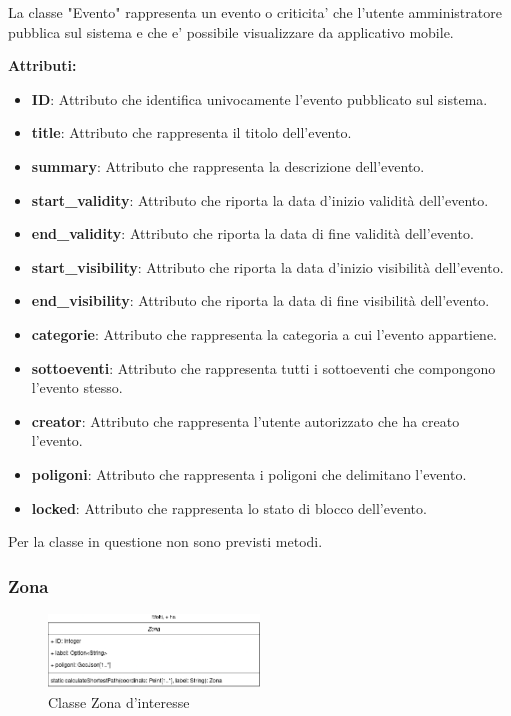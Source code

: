 \documentclass{article}
\begin{document}
La classe "Evento" rappresenta un evento o criticita' che l'utente amministratore pubblica sul sistema e che e' possibile visualizzare da applicativo mobile.

\textbf{Attributi:}\\
\begin{itemize}
	\item \textbf{ID}: Attributo che identifica univocamente l'evento pubblicato sul sistema.
	\item \textbf{title}: Attributo che rappresenta il titolo dell'evento.
	\item \textbf{summary}: Attributo che rappresenta la descrizione dell'evento.
	\item \textbf{start\_validity}: Attributo che riporta la data d'inizio validità dell'evento.
	\item \textbf{end\_validity}: Attributo che riporta la data di fine validità dell'evento.
	\item \textbf{start\_visibility}: Attributo che riporta la data d'inizio visibilità dell'evento.
	\item \textbf{end\_visibility}: Attributo che riporta la data di fine visibilità dell'evento.
	\item \textbf{categorie}: Attributo che rappresenta la categoria a cui l'evento appartiene.
	\item \textbf{sottoeventi}: Attributo che rappresenta tutti i sottoeventi che compongono l'evento stesso.
	\item \textbf{creator}: Attributo che rappresenta l'utente autorizzato che ha creato l'evento.
	\item \textbf{poligoni}: Attributo che rappresenta i poligoni che delimitano l'evento.
	\item \textbf{locked}: Attributo che rappresenta lo stato di blocco dell'evento.
\end{itemize}

Per la classe in questione non sono previsti metodi.

\clearpage 

\subsubsection{Zona}

\begin{figure}[htbp]
	\centering
	\includegraphics[width=0.5\textwidth]{Images/Zona-Class.png}
	\caption{Classe Zona d'interesse}
	\label{fig:zona}
\end{figure}
\end{document}
